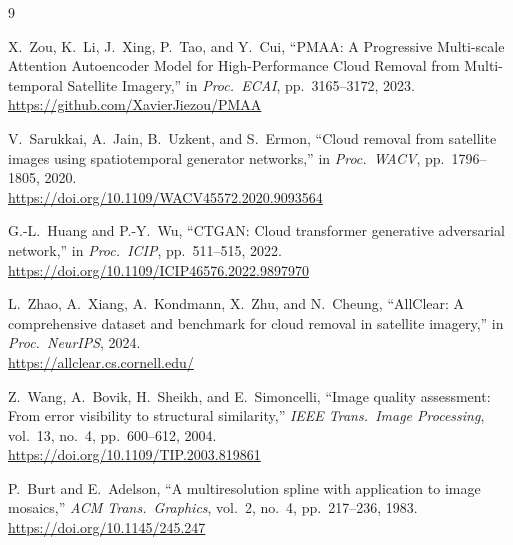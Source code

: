\documentclass[12pt,a4paper]{article}
\begin{document}
\begin{thebibliography}{9}

X.~Zou, K.~Li, J.~Xing, P.~Tao, and Y.~Cui,
``PMAA: A Progressive Multi-scale Attention Autoencoder Model for High-Performance Cloud Removal from Multi-temporal Satellite Imagery,''
in \textit{Proc.\ ECAI}, pp.~3165--3172, 2023.
\\\url{https://github.com/XavierJiezou/PMAA}

V.~Sarukkai, A.~Jain, B.~Uzkent, and S.~Ermon,
``Cloud removal from satellite images using spatiotemporal generator networks,''
in \textit{Proc.\ WACV}, pp.~1796--1805, 2020.
\\\url{https://doi.org/10.1109/WACV45572.2020.9093564}

G.-L.~Huang and P.-Y.~Wu,
``CTGAN: Cloud transformer generative adversarial network,''
in \textit{Proc.\ ICIP}, pp.~511--515, 2022.
\\\url{https://doi.org/10.1109/ICIP46576.2022.9897970}

L.~Zhao, A.~Xiang, A.~Kondmann, X.~Zhu, and N.~Cheung,
``AllClear: A comprehensive dataset and benchmark for cloud removal in satellite imagery,''
in \textit{Proc.\ NeurIPS}, 2024.
\\\url{https://allclear.cs.cornell.edu/}

Z.~Wang, A.~Bovik, H.~Sheikh, and E.~Simoncelli,
``Image quality assessment: From error visibility to structural similarity,''
\textit{IEEE Trans.\ Image Processing}, vol.~13, no.~4, pp.~600--612, 2004.
\\\url{https://doi.org/10.1109/TIP.2003.819861}

P.~Burt and E.~Adelson,
``A multiresolution spline with application to image mosaics,''
\textit{ACM Trans.\ Graphics}, vol.~2, no.~4, pp.~217--236, 1983.
\\\url{https://doi.org/10.1145/245.247}

\end{thebibliography}
\end{document}
